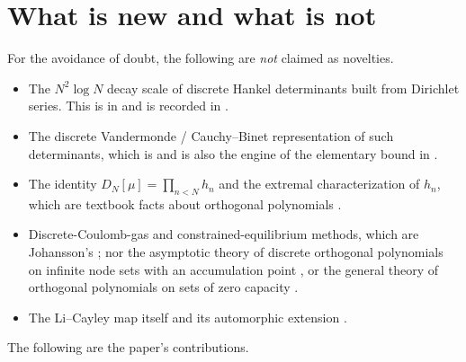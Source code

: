 \documentclass[11pt]{amsart}
\numberwithin{equation}{section}
\theoremstyle{plain}
\theoremstyle{definition}
\theoremstyle{remark}
\begin{document}
\section{What is new and what is not}
\label{sec:position}

For the avoidance of doubt, the following are \emph{not} claimed as novelties.

\begin{itemize}
\item The $N^{2}\log N$ decay scale of discrete Hankel determinants built from Dirichlet series.
This is in \cite{Monien2009} and is recorded in \cite{HaynesZudilin2015}.
\item The discrete Vandermonde / Cauchy--Binet representation of such determinants, which is
\cite{Monien2009} and is also the engine of the elementary bound in \cite{HaynesZudilin2015}.
\item The identity $D_{N}[\mu]=\prod_{n<N}h_{n}$ and the extremal characterization of $h_{n}$, which
are textbook facts about orthogonal polynomials \cite{Chihara1978}.
\item Discrete-Coulomb-gas and constrained-equilibrium methods, which are Johansson's
\cite{Johansson2001}; nor the asymptotic theory of discrete orthogonal polynomials on infinite node
sets with an accumulation point \cite{WuLinXuZhao2016}, or the general theory of orthogonal
polynomials on sets of zero capacity \cite{StahlTotik1992,Totik2005Orthogonal}.
\item The Li--Cayley map itself \cite{Li1997,BombieriLagarias1999} and its automorphic extension
\cite{Lagarias2007}.
\end{itemize}

The following are the paper's contributions.
\end{document}
